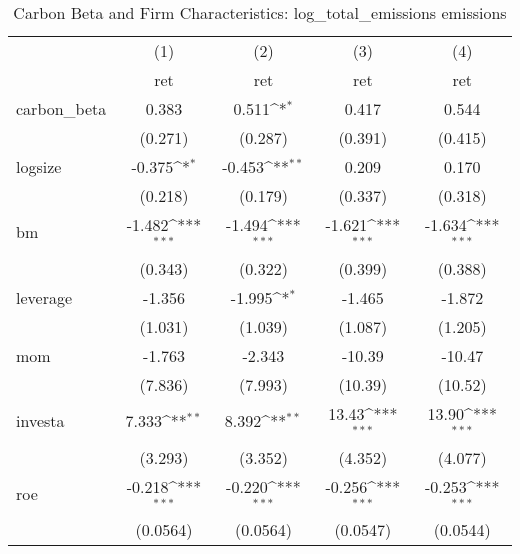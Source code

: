 \begin{table}[htbp]\centering
\def\sym#1{\ifmmode^{#1}\else\(^{#1}\)\fi}
\caption{Carbon Beta and Firm Characteristics: log\_total\_emissions emissions}
\begin{tabular}{l*{4}{c}}
\hline\hline
                    &\multicolumn{1}{c}{(1)}&\multicolumn{1}{c}{(2)}&\multicolumn{1}{c}{(3)}&\multicolumn{1}{c}{(4)}\\
                    &\multicolumn{1}{c}{ret}&\multicolumn{1}{c}{ret}&\multicolumn{1}{c}{ret}&\multicolumn{1}{c}{ret}\\
\hline
carbon\_beta         &       0.383         &       0.511\sym{*}  &       0.417         &       0.544         \\
                    &     (0.271)         &     (0.287)         &     (0.391)         &     (0.415)         \\
[1em]
logsize             &      -0.375\sym{*}  &      -0.453\sym{**} &       0.209         &       0.170         \\
                    &     (0.218)         &     (0.179)         &     (0.337)         &     (0.318)         \\
[1em]
bm                  &      -1.482\sym{***}&      -1.494\sym{***}&      -1.621\sym{***}&      -1.634\sym{***}\\
                    &     (0.343)         &     (0.322)         &     (0.399)         &     (0.388)         \\
[1em]
leverage            &      -1.356         &      -1.995\sym{*}  &      -1.465         &      -1.872         \\
                    &     (1.031)         &     (1.039)         &     (1.087)         &     (1.205)         \\
[1em]
mom                 &      -1.763         &      -2.343         &      -10.39         &      -10.47         \\
                    &     (7.836)         &     (7.993)         &     (10.39)         &     (10.52)         \\
[1em]
investa             &       7.333\sym{**} &       8.392\sym{**} &       13.43\sym{***}&       13.90\sym{***}\\
                    &     (3.293)         &     (3.352)         &     (4.352)         &     (4.077)         \\
[1em]
roe                 &      -0.218\sym{***}&      -0.220\sym{***}&      -0.256\sym{***}&      -0.253\sym{***}\\
                    &    (0.0564)         &    (0.0564)         &    (0.0547)         &    (0.0544)         \\

\end{tabular}
\end{table}
